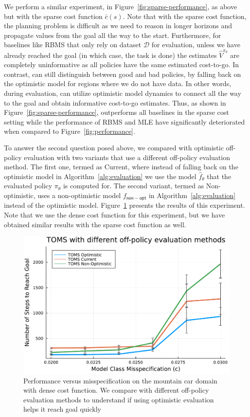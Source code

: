 We perform a similar experiment, in
Figure~\ref{fig:sparse-performance}, as above but with the sparse cost
function $\bar{c}(s)$. Note that with the sparse cost function, the
planning problem is difficult as we need to reason in longer horizons
and propagate values from the goal all the way to the
start. Furthermore, for baselines like RBMS that only rely on dataset
$\mathcal{D}$ for evaluation, unless we have already reached the goal
(in which case, the task is done) the estimates $\hat{V}^{\pi_\theta}$
are completely uninformative as all policies have the same estimated
cost-to-go. In contrast, \taml{} can still distinguish between
good and bad policies, by falling back on the optimistic model for
regions where we do not have data. In other words, during evaluation,
\taml{} can utilize optimistic model dynamics to connect all the way
to the goal and obtain informative cost-to-go estimates. Thus, as
shown in Figure~\ref{fig:sparse-performance}, \taml{} outperforms all
baselines in the sparse cost setting while the performance of RBMS and
MLE have significantly deteriorated when compared to
Figure~\ref{fig:performance}. 

To answer the second question posed above, we compared \taml{} with
optimistic off-policy evaluation with two variants that use a
different off-policy evaluation method. The first one, termed as
\taml{} Current, where instead of falling back on the optimistic model
in Algorithm~\ref{alg:evaluation} we use the model $\hat{f}_\theta$
that the evaluated policy $\pi_\theta$ is computed for. The second
variant, termed as \taml{} Non-optimistic, uses a non-optimistic model
$f_{\mathsf{non-opt}}$ in Algorithm~\ref{alg:evaluation} instead of the
optimistic model. Figure~\ref{fig:evaluation} presents the results of
this experiment. Note that we use the dense cost function for this
experiment, but we have obtained similar results with the sparse cost
function as well.

\begin{figure}[t]
  \centering
  \includegraphics[width=0.5\linewidth]{figures/taml/mountain_car_online_model_search_toms_dense.pdf}
  \caption{Performance versus misspecification on the mountain car
    domain with dense cost function. We compare \taml{} with different off-policy evaluation
    methods to understand if using optimistic evaluation helps it
    reach goal quickly}
  \label{fig:evaluation}
\end{figure}

